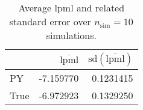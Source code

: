 \begin{table}[H]

\caption{Average lpml and related standard error over $n_{\text{sim}} = 10$ simulations.}
\centering
\begin{tabular}[t]{lrr}
\toprule
  & $\overbar{\text{lpml}}$ & $\text{sd}(\overbar{\text{lpml}})$\\
\midrule
PY & -7.159770 & 0.1231415\\
True & -6.972923 & 0.1329250\\
\bottomrule
\end{tabular}
\end{table}